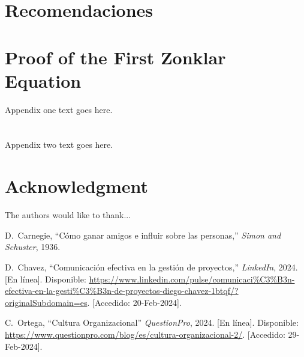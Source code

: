 \documentclass[journal]{IEEEtran}
\begin{document}
\section{Recomendaciones}

\appendices
\section{Proof of the First Zonklar Equation}
Appendix one text goes here.

\section{}
Appendix two text goes here.

\section*{Acknowledgment}

The authors would like to thank...

\begin{thebibliography}{1}
  
D.~Carnegie, ``Cómo ganar amigos e influir sobre las personas,'' \emph{Simon and Schuster}, 1936.
  
D.~Chavez, ``Comunicación efectiva en la gestión de proyectos,'' \emph{LinkedIn}, 2024. [En línea]. Disponible: \url{https://www.linkedin.com/pulse/comunicaci%C3%B3n-efectiva-en-la-gesti%C3%B3n-de-proyectos-diego-chavez-1btqf/?originalSubdomain=es}. [Accedido: 20-Feb-2024].

C.~Ortega,  ``Cultura Organizacional'' \emph{QuestionPro}, 2024. [En línea]. Disponible: \url{https://www.questionpro.com/blog/es/cultura-organizacional-2/}. [Accedido: 29-Feb-2024].

\end{thebibliography}
\end{document}
